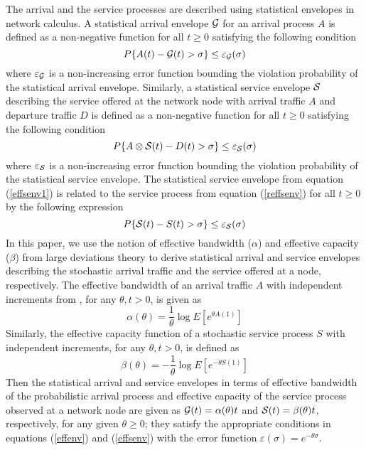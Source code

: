 \documentclass[letterpaper]{IEEEtran}
\begin{document}
The arrival and the service processes are described using statistical envelopes in network calculus. A statistical arrival envelope ${\cal G}$ for an arrival process $A$ is defined as a non-negative function for all $t \geq 0$ satisfying the following condition
\begin{equation}
	P\{A(t) - {\cal G}(t) > \sigma\} \le \varepsilon_{{\cal G}} (\sigma)
	 	\label{effenv}
\end{equation}
where $\varepsilon_{{\cal G}}$ is a non-increasing error function bounding the violation probability of the statistical arrival envelope. Similarly, a statistical service envelope ${\cal S}$ describing the service offered at the network node with arrival traffic $A$ and departure traffic $D$ is defined as a non-negative function for all $t \geq 0$ satisfying the following condition
\begin{equation}
	P\{A \otimes {\cal S}(t) - D(t) > \sigma\} \le \varepsilon_{{\cal S}} (\sigma)
	 	\label{effsenv1}
\end{equation}
where $\varepsilon_{{\cal S}}$ is a non-increasing error function bounding the violation probability of the statistical service envelope. The statistical service envelope from equation (\ref{effsenv1}) is related to the service process from equation (\ref{reffsenv}) for all $t \ge 0$ by the following expression
\begin{equation}
	P\{{\cal S}(t) - S(t) > \sigma\} \le \varepsilon_{{\cal S}} (\sigma)
	 	\label{effsenv}
\end{equation} In this paper, we use the notion of effective bandwidth ($\alpha$) \cite{kelly:1996} and effective capacity ($\beta$) \cite{kumar:2001,wu:2003,MMB:2008} from large deviations theory to derive statistical arrival and service envelopes describing the stochastic arrival traffic and the service offered at a node, respectively. The effective bandwidth of an arrival traffic $A$ with independent increments from \cite{kelly:1996}, for any $ \theta, t > 0$, is given as
\begin{equation}
\alpha(\theta) = \frac{1}{\theta} \log{E\left[ e^{\theta A(1)}\right]}  
\label{eb}
\end{equation}
Similarly, the effective capacity function of a stochastic service process $S$ with independent increments, for any $\theta, t > 0$, is defined as
\begin{equation}
{\beta}(\theta) = - \frac{1}{\theta} \log{E\left[ e^{-\theta  S(1)}\right]}
	 	\label{ec}
\end{equation} 
Then the statistical arrival and service envelopes in terms of effective bandwidth of the probabilistic arrival process and effective capacity of the service process observed at a network node are given as ${\cal G}(t) = \alpha(\theta)t$ and ${\cal S}(t) = \beta(\theta)t$, respectively, for any given $\theta \ge 0$; they satisfy the appropriate conditions in equations (\ref{effenv}) and (\ref{effsenv}) with the error function $\varepsilon (\sigma) = e^{-\theta \sigma}$.
\end{document}
